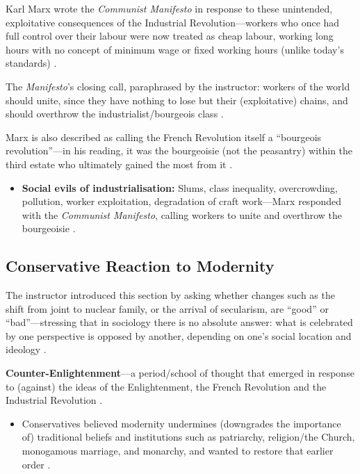 \begin{GovtPolicy}
Karl Marx wrote the \textit{Communist Manifesto} in response to these unintended, exploitative consequences of the Industrial Revolution---workers who once had full control over their labour were now treated as cheap labour, working long hours with no concept of minimum wage or fixed working hours (unlike today's standards) .

The \textit{Manifesto}'s closing call, paraphrased by the instructor: workers of the world should unite, since they have nothing to lose but their (exploitative) chains, and should overthrow the industrialist/bourgeois class .

Marx is also described as calling the French Revolution itself a ``bourgeois revolution''---in his reading, it was the bourgeoisie (not the peasantry) within the third estate who ultimately gained the most from it .
\end{GovtPolicy}

\begin{QuickRevision}
\begin{itemize}
    \item \textbf{Social evils of industrialisation:} Slums, class inequality, overcrowding, pollution, worker exploitation, degradation of craft work---Marx responded with the \textit{Communist Manifesto}, calling workers to unite and overthrow the bourgeoisie .
\end{itemize}
\end{QuickRevision}

\subsection{Conservative Reaction to Modernity}
The instructor introduced this section by asking whether changes such as the shift from joint to nuclear family, or the arrival of secularism, are ``good'' or ``bad''---stressing that in sociology there is no absolute answer: what is celebrated by one perspective is opposed by another, depending on one's social location and ideology .

\begin{KeyConcept}
\textbf{Counter-Enlightenment}---a period/school of thought that emerged in response to (against) the ideas of the Enlightenment, the French Revolution and the Industrial Revolution .
\begin{itemize}
    \item Conservatives believed modernity undermines (downgrades the importance of) traditional beliefs and institutions such as patriarchy, religion/the Church, monogamous marriage, and monarchy, and wanted to restore that earlier order .
\end{itemize}
\end{KeyConcept}

